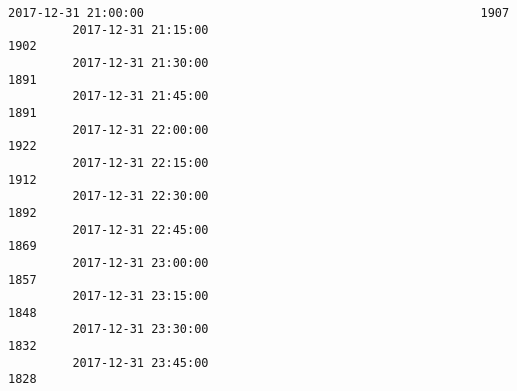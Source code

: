 \documentclass[11pt]{article}
\begin{document}
\begin{Verbatim}[commandchars=\\\{\}]
         2017-12-31 21:00:00                                               1907               
         2017-12-31 21:15:00                                               1902               
         2017-12-31 21:30:00                                               1891               
         2017-12-31 21:45:00                                               1891               
         2017-12-31 22:00:00                                               1922               
         2017-12-31 22:15:00                                               1912               
         2017-12-31 22:30:00                                               1892               
         2017-12-31 22:45:00                                               1869               
         2017-12-31 23:00:00                                               1857               
         2017-12-31 23:15:00                                               1848               
         2017-12-31 23:30:00                                               1832               
         2017-12-31 23:45:00                                               1828               
         

\end{Verbatim}
\end{document}
